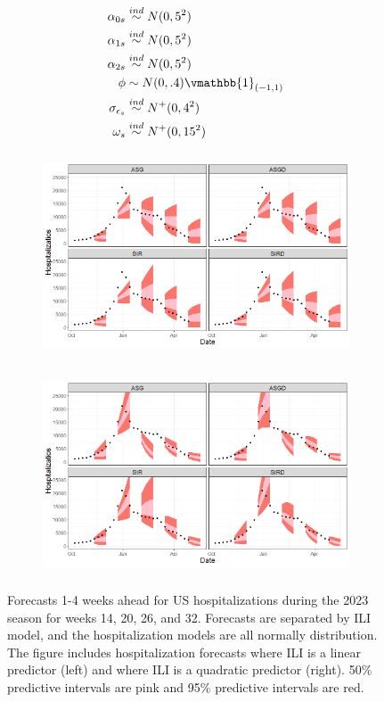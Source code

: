 \documentclass[ba]{imsart}
\theoremstyle{plain}
\theoremstyle{definition}
\theoremstyle{remark}
\begin{document}
\begin{equation}
\begin{aligned}
\label{eq:shared_hosp_priors}
        \alpha_{0s} &\overset{ind}{\sim} N(0, 5^2)\\
        \alpha_{1s} &\overset{ind}{\sim} N(0, 5^2)\\
        \alpha_{2s} &\overset{ind}{\sim} N(0, 5^2) \\
        \phi &\sim N(0, .4)\vmathbb{1}_{(-1,1)} \\
        \sigma_{\epsilon_s} &\overset{ind}{\sim} N^+(0, 4^2) \\
        \omega_s &\overset{ind}{\sim} N^+(0, 15^2)
\end{aligned}
\end{equation}





\begin{figure}
\centering
\begin{subfigure}
  \centering
  \includegraphics[width=.49\linewidth,height=6cm]{Images/normal_forecasts_us.png}
\end{subfigure}%
\begin{subfigure}
  \centering
  \includegraphics[width=.49\linewidth, height=6cm]{Images/normal_sq_forecasts_us.png}
\end{subfigure}
\caption{Forecasts 1-4 weeks ahead for US hospitalizations during the 2023 season for weeks 14, 20, 26, and 32. Forecasts are separated by ILI model, and the hospitalization models are all normally distribution. The figure includes hospitalization forecasts where ILI is a linear predictor (left) and where ILI is a quadratic predictor (right). 50\% predictive intervals are pink and 95\% predictive intervals are red.}
\label{fig:normal_flu_forecasts}
\end{figure}
\end{document}
